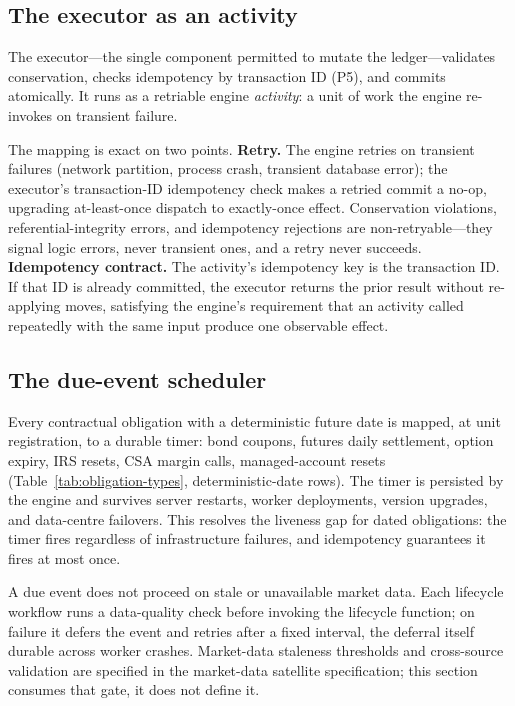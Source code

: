 \documentclass[11pt,a4paper]{article}
\begin{document}
\subsection{The executor as an activity}
\label{sec:executor-activity}

The executor---the single component permitted to mutate the ledger---validates conservation, checks idempotency by transaction ID (P5), and commits atomically. It runs as a retriable engine \emph{activity}: a unit of work the engine re-invokes on transient failure.

The mapping is exact on two points. \textbf{Retry.} The engine retries on transient failures (network partition, process crash, transient database error); the executor's transaction-ID idempotency check makes a retried commit a no-op, upgrading at-least-once dispatch to exactly-once effect. Conservation violations, referential-integrity errors, and idempotency rejections are non-retryable---they signal logic errors, never transient ones, and a retry never succeeds. \textbf{Idempotency contract.} The activity's idempotency key is the transaction ID. If that ID is already committed, the executor returns the prior result without re-applying moves, satisfying the engine's requirement that an activity called repeatedly with the same input produce one observable effect.

\subsection{The due-event scheduler}
\label{sec:temporal-scheduler}

Every contractual obligation with a deterministic future date is mapped, at unit registration, to a durable timer: bond coupons, futures daily settlement, option expiry, IRS resets, CSA margin calls, managed-account resets (Table~\ref{tab:obligation-types}, deterministic-date rows). The timer is persisted by the engine and survives server restarts, worker deployments, version upgrades, and data-centre failovers. This resolves the liveness gap for dated obligations: the timer fires regardless of infrastructure failures, and idempotency guarantees it fires at most once.

A due event does not proceed on stale or unavailable market data. Each lifecycle workflow runs a data-quality check before invoking the lifecycle function; on failure it defers the event and retries after a fixed interval, the deferral itself durable across worker crashes. Market-data staleness thresholds and cross-source validation are specified in the market-data satellite specification; this section consumes that gate, it does not define it.
\end{document}
